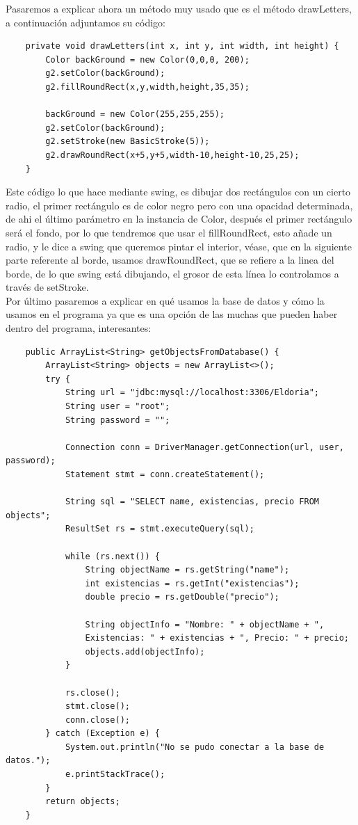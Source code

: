 \documentclass[a4paper]{article}
\begin{document}
Pasaremos a explicar ahora un método muy usado que es el método drawLetters, a continuación adjuntamos su código:
\begin{lstlisting}
    private void drawLetters(int x, int y, int width, int height) {
        Color backGround = new Color(0,0,0, 200);
        g2.setColor(backGround);
        g2.fillRoundRect(x,y,width,height,35,35);

        backGround = new Color(255,255,255);
        g2.setColor(backGround);
        g2.setStroke(new BasicStroke(5));
        g2.drawRoundRect(x+5,y+5,width-10,height-10,25,25);
    }
\end{lstlisting}
Este código lo que hace mediante swing, es dibujar dos rectángulos con un cierto radio, el primer rectángulo es de color negro pero con una opacidad determinada, de ahi el último parámetro
en la instancia de Color, después el primer rectángulo será el fondo, por lo que tendremos que usar el fillRoundRect, esto añade un radio, y le dice a swing que queremos pintar el interior, véase, que en
la siguiente parte referente al borde, usamos drawRoundRect, que se refiere a la linea del borde, de lo que swing está dibujando, el grosor de esta línea lo controlamos a través de setStroke.\\
Por último pasaremos a explicar en qué usamos la base de datos y cómo la usamos en el programa ya que es una opción de las muchas que pueden haber dentro del programa, interesantes:
\begin{lstlisting}
    public ArrayList<String> getObjectsFromDatabase() {
        ArrayList<String> objects = new ArrayList<>();
        try {
            String url = "jdbc:mysql://localhost:3306/Eldoria";
            String user = "root";
            String password = "";

            Connection conn = DriverManager.getConnection(url, user, password);
            Statement stmt = conn.createStatement();

            String sql = "SELECT name, existencias, precio FROM objects";
            ResultSet rs = stmt.executeQuery(sql);

            while (rs.next()) {
                String objectName = rs.getString("name");
                int existencias = rs.getInt("existencias");
                double precio = rs.getDouble("precio");

                String objectInfo = "Nombre: " + objectName + ", 
                Existencias: " + existencias + ", Precio: " + precio;
                objects.add(objectInfo);
            }

            rs.close();
            stmt.close();
            conn.close();
        } catch (Exception e) {
            System.out.println("No se pudo conectar a la base de datos.");
            e.printStackTrace();
        }
        return objects;
    }
\end{lstlisting}
\end{document}

